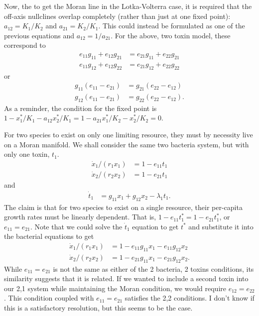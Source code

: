 \documentclass[a4paper,11pt]{article}
\numberwithin{equation}{section} %
\begin{document}
Now, the to get the Moran line in the Lotka-Volterra case, it is required that the off-axis nullclines overlap completely (rather than just at one fixed point): $a_{12}=K_1/K_2$ and $a_{21}=K_2/K_1$. 
This could instead be formulated as one of the previous equations and $a_{12}=1/a_{21}$. 
For the above, two toxin model, these correspond to
\begin{align}
e_{11}g_{11}+e_{12}g_{21}&=e_{21}g_{11}+e_{22}g_{21} \\
e_{11}g_{12}+e_{12}g_{22}&=e_{21}g_{12}+e_{22}g_{22}
\end{align}
or
\begin{align*}
g_{11}(e_{11}-e_{21})&=g_{21}(e_{22}-e_{12}) \\
g_{12}(e_{11}-e_{21})&=g_{22}(e_{22}-e_{12}). 
\end{align*}
As a reminder, the condition for the fixed point is $1 - x^*_1/K_1 - a_{12}x^*_2/K_1=1 - a_{21}x^*_1/K_2 - x^*_2/K_2=0$. 

For two species to exist on only one limiting resource, they must by necessity live on a Moran manifold. 
We shall consider the same two bacteria system, but with only one toxin, $t_1$. 
\begin{align*}
\dot{x}_1/(r_1 x_1) &= 1 - e_{11} t_1 \\
\dot{x}_2/(r_2 x_2) &= 1 - e_{21} t_1
\end{align*}
and
\begin{align*}
\dot{t}_1 &= g_{11}x_1+g_{12}x_2 - \lambda_1 t_1. 
\end{align*}
The claim is that for two species to exist on a single resource, their per-capita growth rates must be linearly dependent. 
That is, $1-e_{11}t^*_1=1-e_{21}t^*_1$, or $e_{11}=e_{21}$. 
Note that we could solve the $\dot{t}_1$ equation to get $t^*$ and substitute it into the bacterial equations to get
\begin{align*}
\dot{x}_1/(r_1 x_1) &= 1 - e_{11}g_{11} x_1 - e_{11}g_{12} x_2 \\
\dot{x}_2/(r_2 x_2) &= 1 - e_{21}g_{11} x_1 - e_{21}g_{12} x_2. 
\end{align*}
While $e_{11}=e_{21}$ is not the same as either of the 2 bacteria, 2 toxins conditions, its similarity suggests that it is related. 
If we wanted to include a second toxin into our 2,1 system while maintaining the Moran condition, we would require $e_{12}=e_{22}$. 
This condition coupled with $e_{11}=e_{21}$ satisfies the 2,2 conditions. 
I don't know if this is a satisfactory resolution, but this seems to be the case. 
\end{document}
